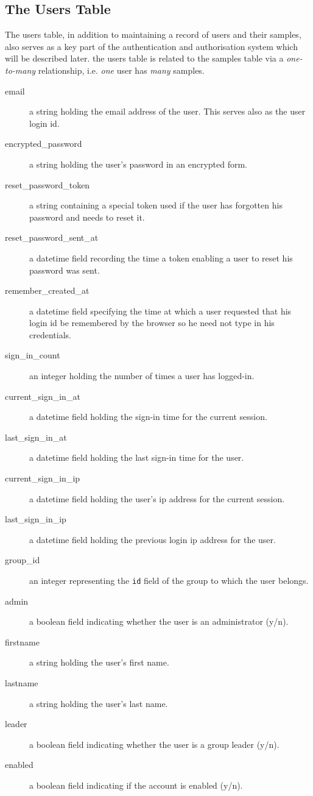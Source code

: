 \documentclass[12pt,twoside]{article}
\begin{document}
\subsection{The Users Table}
The users table, in addition to maintaining a record of users and their
samples, also serves as a key part of the authentication and authorisation
system which will be described later. the users table is related to the
samples table via a \emph{one-to-many} relationship, i.e. \emph{one} user
has \emph{many} samples.
\begin{description}
\item[email]
a string holding the email address of the user. This serves also as the
user login id.
\item[encrypted\_password]
a string holding the user's password in an encrypted form.
\item[reset\_password\_token]
a string containing a special token used if the user has forgotten his
password and needs to reset it.
\item[reset\_password\_sent\_at]
a datetime field recording the time a token enabling a user to reset his
password was sent.
\item[remember\_created\_at]
a datetime field specifying the time at which a user requested that his
login id be remembered by the browser so he need not type in his credentials.
\item[sign\_in\_count]
an integer holding the number of times a user has logged-in.
\item[current\_sign\_in\_at]
a datetime field holding the sign-in time for the current session.
\item[last\_sign\_in\_at]
a datetime field holding the last sign-in time for the user.
\item[current\_sign\_in\_ip]
a datetime field holding the user's ip address for the current session.
\item[last\_sign\_in\_ip]
a datetime field holding the previous login ip address for the user.
\item[group\_id]
an integer representing the \verb=id= field of the group to which
the user belongs.
\item[admin]
a boolean field indicating whether the user is an administrator (y/n).
\item[firstname]
a string holding the user's first name.
\item[lastname]
a string holding the user's last name.
\item[leader]
a boolean field indicating whether the user is a group leader (y/n).
\item[enabled]
a boolean field indicating if the account is enabled (y/n).

\end{description}
\end{document}
